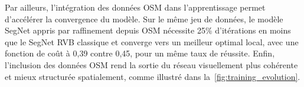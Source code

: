 Par ailleurs, l'intégration des données OSM dans l'apprentissage permet d'accélérer la convergence du modèle. Sur le même jeu de données, le modèle SegNet appris par raffinement depuis OSM nécessite 25\% d'itérations en moins que le SegNet RVB classique et converge vers un meilleur optimal local, avec une fonction de coût à 0,39 contre 0,45, pour un même taux de réussite. Enfin, l'inclusion des données OSM rend la sortie du réseau visuellement plus cohérente et mieux structurée spatialement, comme illustré dans la~\cref{fig:training_evolution}.

%
%
\printbibliography
